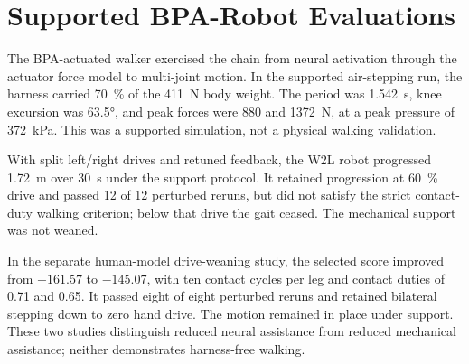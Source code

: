 \section{Supported BPA-Robot Evaluations}\label{sec:sns_controller_comparison}

The BPA-actuated walker exercised the chain from neural activation through the actuator force model to multi-joint motion. In the supported air-stepping run, the harness carried \qty{70}{\percent} of the \qty{411}{\newton} body weight. The period was \qty{1.542}{\second}, knee excursion was \ang{63.5}, and peak forces were \qty{880}{} and \qty{1372}{\newton}, at a peak pressure of \qty{372}{\kPa}. This was a supported simulation, not a physical walking validation.

With split left/right drives and retuned feedback, the W2L robot progressed \qty{1.72}{\meter} over \qty{30}{\second} under the support protocol. It retained progression at \qty{60}{\percent} drive and passed 12 of 12 perturbed reruns, but did not satisfy the strict contact-duty walking criterion; below that drive the gait ceased. The mechanical support was not weaned.

In the separate human-model drive-weaning study, the selected score improved from $-161.57$ to $-145.07$, with ten contact cycles per leg and contact duties of 0.71 and 0.65. It passed eight of eight perturbed reruns and retained bilateral stepping down to zero hand drive. The motion remained in place under support. These two studies distinguish reduced neural assistance from reduced mechanical assistance; neither demonstrates harness-free walking.
